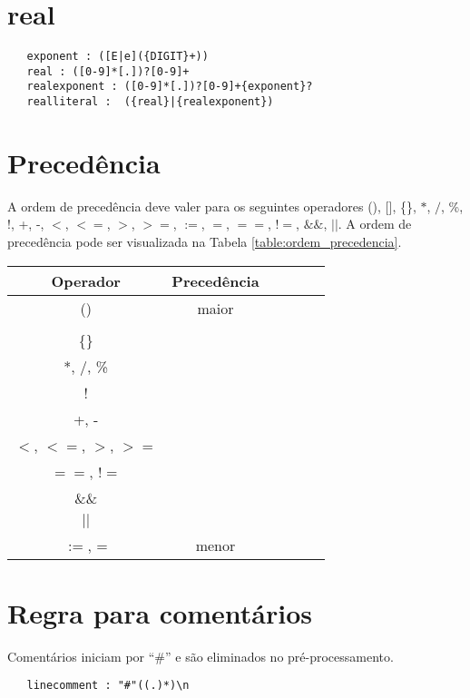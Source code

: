 \section{real}
\begin{verbatim}
   exponent : ([E|e]({DIGIT}+))
   real : ([0-9]*[.])?[0-9]+
   realexponent : ([0-9]*[.])?[0-9]+{exponent}?
   realliteral :  ({real}|{realexponent})
\end{verbatim}

\section{Precedência}
A ordem de precedência deve valer para os seguintes operadores (), [], \{\}, $*$, $/$, \%, !, +, -, $<$, $<=$, $>$, $>=$, $:=$, $=$, $==$, $!=$, $\&\&$, $||$. A ordem de precedência pode ser visualizada na Tabela \ref{table:ordem_precedencia}.

\begin{table*}[h]
\renewcommand{\arraystretch}{1.34}
\centering
\begin{tabular}{| c | c | c | c | c | c |}
\hline
\bfseries Operador & \bfseries Precedência  \\
\hline
() & maior \\ \hline
[] &  \\ \hline
\{\} &  \\ \hline
 *, /, \% & \\ \hline
  ! & \\ \hline
 +, - & \\ \hline
$<$, $<=$, $>$, $>=$ & \\ \hline
$==$, $!=$ & \\ \hline
\&\& & \\ \hline
$||$ & \\ \hline
$:=$, = & menor\\ \hline
\end{tabular}
\caption{Ordem de precedência para os operadores.}
\label{table:ordem_precedencia}
\end{table*}

\section{Regra para comentários}
    Comentários iniciam por ``\#'' e são eliminados no pré-processamento.
\begin{verbatim}
   linecomment : "#"((.)*)\n
\end{verbatim}
